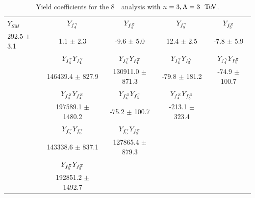 
\begin{table}[htbp]
\small
\centering
\begin{tabular}{lcccc}
\hline\hline
       $Y_{SM}$ &             $Y_{f_{4}^{\gamma}}$ &             $Y_{f_{4}^{Z}}$ &             $Y_{f_{5}^{\gamma}}$ &             $Y_{f_{5}^{Z}}$ \\
292.5 $\pm$ 3.1 &             1.1 $\pm$ 2.3 &            -9.6 $\pm$ 5.0 &            12.4 $\pm$ 2.5 &            -7.8 $\pm$ 5.9 \\
\hline
                &  $Y_{f_{4}^{\gamma}}Y_{f_{4}^{\gamma}}$ &  $Y_{f_{4}^{\gamma}}Y_{f_{4}^{Z}}$ &  $Y_{f_{4}^{\gamma}}Y_{f_{5}^{\gamma}}$ &  $Y_{f_{4}^{\gamma}}Y_{f_{5}^{Z}}$ \\
                &      146439.4 $\pm$ 827.9 &      130911.0 $\pm$ 871.3 &         -79.8 $\pm$ 181.2 &         -74.9 $\pm$ 100.7 \\
\hline
                &  $Y_{f_{4}^{Z}}Y_{f_{4}^{Z}}$ &  $Y_{f_{4}^{Z}}Y_{f_{5}^{\gamma}}$ &  $Y_{f_{4}^{Z}}Y_{f_{5}^{Z}}$ \\
                &     197589.1 $\pm$ 1480.2 &         -75.2 $\pm$ 100.7 &        -213.1 $\pm$ 323.4 \\
\hline
                &  $Y_{f_{5}^{\gamma}}Y_{f_{5}^{\gamma}}$ &  $Y_{f_{5}^{\gamma}}Y_{f_{5}^{Z}}$ \\
                &      143338.6 $\pm$ 837.1 &      127865.4 $\pm$ 879.3 \\
\hline
                &  $Y_{f_{5}^{Z}}Y_{f_{5}^{Z}}$ \\
                &     192851.2 $\pm$ 1492.7 \\
\hline\hline
\end{tabular}
\caption{Yield coefficients for the 8~\tev\ analysis with \formfactor $n=3, \Lambda=3~\tev$.}
\label{table:TGC-yieldCoeffs-eight-n3L3}
\end{table}

